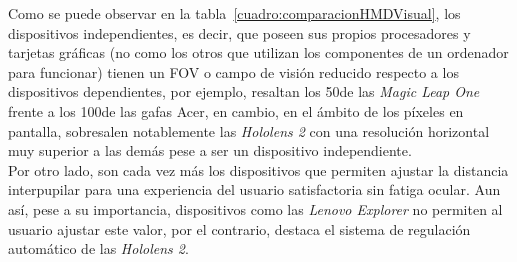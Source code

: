 Como se puede observar en la tabla~\ref{cuadro:comparacionHMDVisual}, los dispositivos independientes, es decir, que poseen sus propios procesadores y tarjetas gráficas (no como los otros que utilizan los componentes de un ordenador para funcionar) tienen un FOV o campo de visión reducido respecto a los dispositivos dependientes, por ejemplo, resaltan los 50\degree  de las \textit{Magic Leap One} frente a los 100\degree  de las gafas Acer, en cambio, en el ámbito de los píxeles en pantalla, sobresalen notablemente las \textit{Hololens 2} con una resolución horizontal muy superior a las demás pese a ser un dispositivo independiente.\\

Por otro lado, son cada vez más los dispositivos que permiten ajustar la distancia interpupilar para una experiencia del usuario satisfactoria sin fatiga ocular. Aun así, pese a su importancia, dispositivos como las \textit{Lenovo Explorer} no permiten al usuario ajustar este valor, por el contrario, destaca el sistema de regulación automático de las \textit{Hololens 2}.\\

\begin{table}[ht]
\caption{Comparación de baterías del casco y los controladores.}
\label{cuadro:comparacionHMDyControladores}
\end{table}

